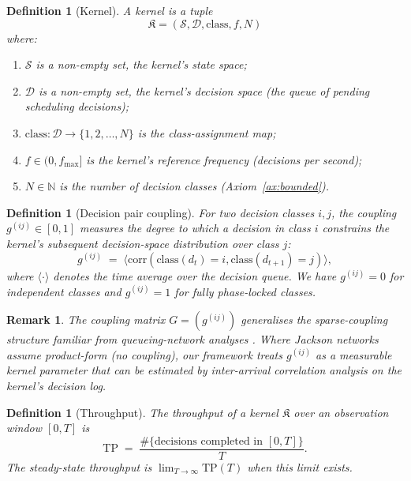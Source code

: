 \documentclass[twocolumn,11pt,a4paper]{article}
\newtheorem{definition}[theorem]{Definition}
\newtheorem{remark}[theorem]{Remark}
\newcommand{\Natural}{\mathbb{N}}
\newcommand{\TP}{\mathrm{TP}}
\newcommand{\Kernel}{\mathfrak{K}}
\begin{document}
\begin{definition}[Kernel]
\label{def:kernel}
A \emph{kernel} is a tuple
\[
\Kernel = (\mathcal{S}, \mathcal{D}, \mathrm{class}, f, N)
\]
where:
\begin{enumerate}[nosep,label=(\roman*)]
\item $\mathcal{S}$ is a non-empty set, the kernel's \emph{state space};
\item $\mathcal{D}$ is a non-empty set, the kernel's \emph{decision space} (the queue of pending scheduling decisions);
\item $\mathrm{class}: \mathcal{D} \to \{1, 2, \ldots, N\}$ is the \emph{class-assignment map};
\item $f \in (0, f_\mathrm{max}]$ is the kernel's \emph{reference frequency} (decisions per second);
\item $N \in \Natural$ is the number of decision classes (Axiom~\ref{ax:bounded}).
\end{enumerate}
\end{definition}

\begin{definition}[Decision pair coupling]
\label{def:coupling}
For two decision classes $i, j$, the \emph{coupling} $g^{(ij)} \in [0, 1]$ measures the degree to which a decision in class $i$ constrains the kernel's subsequent decision-space distribution over class $j$:
\[
g^{(ij)} \;=\; \langle \mathrm{corr}(\mathrm{class}(d_t) = i, \mathrm{class}(d_{t+1}) = j) \rangle,
\]
where $\langle \cdot \rangle$ denotes the time average over the decision queue. We have $g^{(ij)} = 0$ for independent classes and $g^{(ij)} = 1$ for fully phase-locked classes.
\end{definition}

\begin{remark}
The coupling matrix $G = (g^{(ij)})$ generalises the sparse-coupling structure familiar from queueing-network analyses \citep{baskett1975,jackson1957}. Where Jackson networks assume product-form (no coupling), our framework treats $g^{(ij)}$ as a measurable kernel parameter that can be estimated by inter-arrival correlation analysis on the kernel's decision log.
\end{remark}

\begin{definition}[Throughput]
\label{def:throughput}
The \emph{throughput} of a kernel $\Kernel$ over an observation window $[0, T]$ is
\[
\TP \;=\; \frac{\#\{\text{decisions completed in } [0,T]\}}{T}.
\]
The \emph{steady-state throughput} is $\lim_{T \to \infty} \TP(T)$ when this limit exists.
\end{definition}
\end{document}
